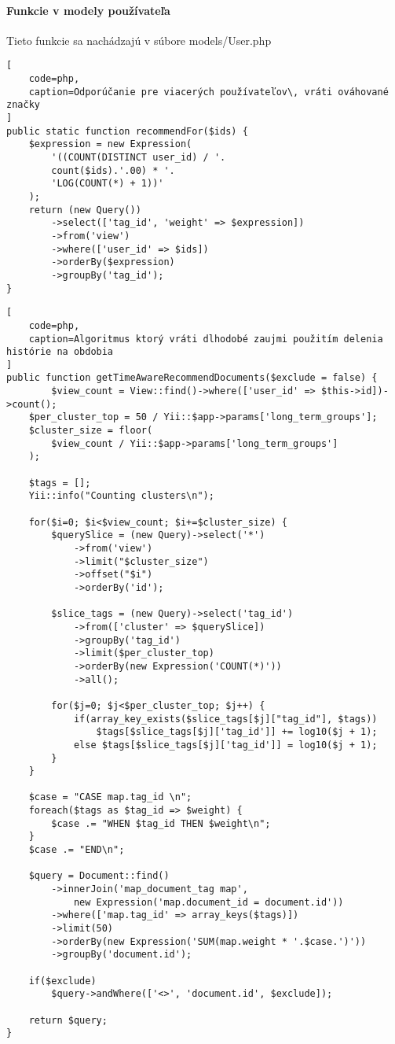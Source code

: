 \paragraph{Funkcie v modely používateľa}

Tieto funkcie sa nachádzajú v súbore models/User.php

\begin{lstlisting}[
    code=php,
    caption=Odporúčanie pre viacerých používateľov\, vráti ováhované značky
]
public static function recommendFor($ids) {
    $expression = new Expression(
        '((COUNT(DISTINCT user_id) / '.
        count($ids).'.00) * '.
        'LOG(COUNT(*) + 1))'
    );
    return (new Query())
        ->select(['tag_id', 'weight' => $expression])
        ->from('view')
        ->where(['user_id' => $ids])
        ->orderBy($expression)
        ->groupBy('tag_id');
}
\end{lstlisting}

\begin{lstlisting}[
    code=php,
    caption=Algoritmus ktorý vráti dlhodobé zaujmi použitím delenia histórie na obdobia
]
public function getTimeAwareRecommendDocuments($exclude = false) {
        $view_count = View::find()->where(['user_id' => $this->id])->count();
    $per_cluster_top = 50 / Yii::$app->params['long_term_groups'];
    $cluster_size = floor(
        $view_count / Yii::$app->params['long_term_groups']
    );

    $tags = [];
    Yii::info("Counting clusters\n");

    for($i=0; $i<$view_count; $i+=$cluster_size) {
        $querySlice = (new Query)->select('*')
            ->from('view')
            ->limit("$cluster_size")
            ->offset("$i")
            ->orderBy('id');

        $slice_tags = (new Query)->select('tag_id')
            ->from(['cluster' => $querySlice])
            ->groupBy('tag_id')
            ->limit($per_cluster_top)
            ->orderBy(new Expression('COUNT(*)'))
            ->all();

        for($j=0; $j<$per_cluster_top; $j++) {
            if(array_key_exists($slice_tags[$j]["tag_id"], $tags))
                $tags[$slice_tags[$j]['tag_id']] += log10($j + 1);
            else $tags[$slice_tags[$j]['tag_id']] = log10($j + 1);
        }
    }

    $case = "CASE map.tag_id \n";
    foreach($tags as $tag_id => $weight) {
        $case .= "WHEN $tag_id THEN $weight\n";
    }
    $case .= "END\n";

    $query = Document::find()
        ->innerJoin('map_document_tag map',
            new Expression('map.document_id = document.id'))
        ->where(['map.tag_id' => array_keys($tags)])
        ->limit(50)
        ->orderBy(new Expression('SUM(map.weight * '.$case.')'))
        ->groupBy('document.id');

    if($exclude)
        $query->andWhere(['<>', 'document.id', $exclude]);

    return $query;
}
\end{lstlisting}


